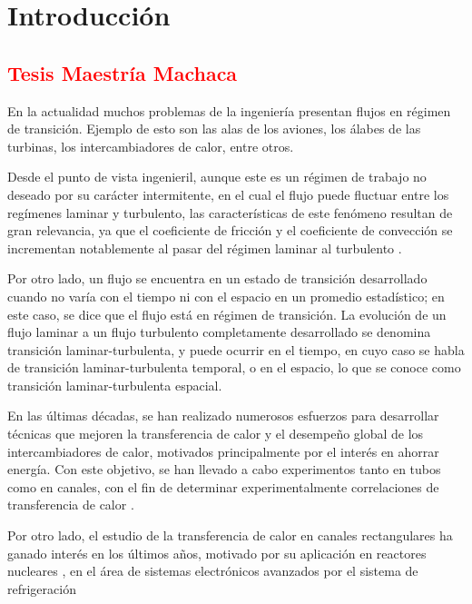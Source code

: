 \chapter{Introducción}
\label{intro}

\section{\textcolor{red}{Tesis Maestría Machaca}}

En la actualidad muchos problemas de la ingeniería presentan flujos en régimen de transición. Ejemplo de esto son las alas de los aviones, los  álabes de las turbinas, los intercambiadores de calor, entre otros. 

Desde el punto de vista ingenieril, aunque este es un régimen de trabajo no deseado por su carácter intermitente, en el cual el flujo puede fluctuar entre los regímenes laminar y turbulento, las características de este fenómeno resultan de gran relevancia, ya que el coeficiente de fricción \cite{white} y el coeficiente de convección \cite{incropera} se incrementan notablemente al pasar del régimen laminar al turbulento \cite{tam2006transitional}.

Por otro lado, un flujo se encuentra en un estado de transición desarrollado cuando no varía con el tiempo ni con el espacio en un promedio estadístico; en este caso, se dice que el flujo está en régimen de transición. La evolución de un flujo laminar a un flujo turbulento completamente desarrollado se denomina transición laminar-turbulenta, y puede ocurrir en el tiempo, en cuyo caso se habla de transición laminar-turbulenta temporal, o en el espacio, lo que se conoce como transición laminar-turbulenta espacial.


En las últimas décadas, se han realizado numerosos esfuerzos para desarrollar técnicas que mejoren la transferencia de calor y el desempeño global de los intercambiadores de calor, motivados principalmente por el interés en ahorrar energía. Con este objetivo, se han llevado a cabo experimentos tanto en tubos como en canales, con el fin de determinar experimentalmente correlaciones de transferencia de calor \cite{hausen1959new, gnielinski1976new, churchill1977comprehensive, sleicher1975convenient}.

Por otro lado, el estudio de la transferencia de calor en canales rectangulares ha ganado interés en los últimos años, motivado por su aplicación en reactores nucleares \cite{sikorska2024convective}, en el área de sistemas electrónicos avanzados por el sistema de refrigeración \cite{kamdem2020numerical}

